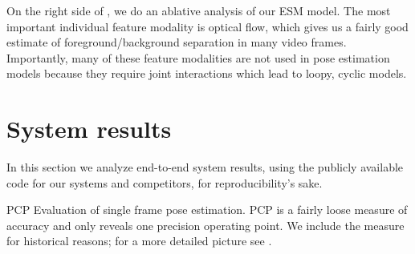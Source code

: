 On the right side of , we do an ablative analysis of our ESM 
model.  The most important individual feature modality is optical flow, which 
gives us a fairly good estimate of foreground/background separation in many 
video frames.  Importantly, many of these feature modalities are not used in 
pose estimation models because they require joint interactions which lead to 
loopy, cyclic models.


\section{System results}\label{sec:system-results}
In this section we analyze end-to-end system results, using the publicly 
available code for our systems and competitors, for reproducibility's sake.
\begin{table}[tb]
\begin{center}

\caption[PCP evaluation.]{PCP Evaluation of single frame pose estimation. PCP 
is a fairly loose measure of accuracy and only reveals one precision operating 
point.  We include the measure for historical reasons; for a more detailed 
picture see .}
\label{tab:res-table} 
\end{center}
\end{table}


